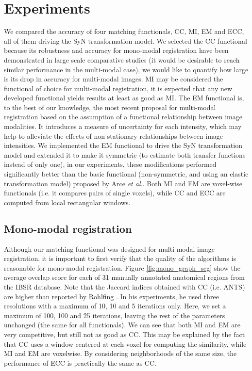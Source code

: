 \section{Experiments}
We compared the accuracy of four matching functionals, CC, MI, EM and ECC, all of them driving the SyN transformation model. We selected the CC functional because its robustness and accuracy for mono-modal registration have been demonstrated in large scale comparative studies \cite{Klein2009, Klein2010, Rohlfing2012} (it would be desirable to reach similar performance in the multi-modal case), we would like to quantify how large is its drop in accuracy for multi-modal images. MI \cite{Maes1997, Mattes2003} may be considered the functional of choice for multi-modal registration, it is expected that any new developed functional yields results at least as good as MI. The EM functional \cite{Arce-santana2014} is, to the best of our knowledge, the most recent proposal for multi-modal registration based on the assumption of a functional relationship between image modalities. It introduces a measure of uncertainty for each intensity, which may help to alleviate the effects of non-stationary relationships between image intensities. We implemented the EM functional to drive the SyN transformation model and extended it to make it symmetric (to estimate both transfer functions instead of only one), in our experiments, these modifications performed significantly better than the basic functional (non-symmetric, and using an elastic transformation model) proposed by Arce {\it et al.}\cite{Arce-santana2014}. Both MI and EM are voxel-wise functionals (i.e. it compares pairs of single voxels), while CC and ECC are computed from local rectangular windows.

\subsection{Mono-modal registration}
Although our matching functional was designed for multi-modal image registration, it is important to first verify that the quality of the algorithms is reasonable for mono-modal registration. Figure \ref{fig:mono_graph_seg} show the average overlap score for each of 31 manually annotated anatomical regions from the IBSR database. Note that the Jaccard indices obtained with CC (i.e. ANTS) are higher than reported by Rohlfing \cite{Rohlfing2012}. In his experiments, he used three resolutions with a maximum of 10, 10 and 5 iterations only. Here, we set a maximum of 100, 100 and 25 iterations, leaving the rest of the parameters unchanged (the same for all functionals). We can see that both MI and EM are very competitive, but still not as good as CC. This may be explained by the fact that CC uses a window centered at each voxel for computing the similarity, while MI and EM are voxelwise. By considering neighborhoods of the same size, the performance of ECC is practically the same as CC. 
%
%


